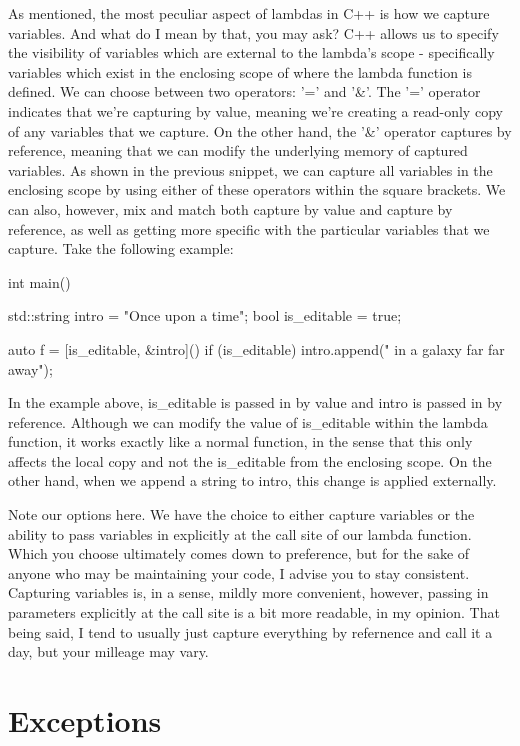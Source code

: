 \documentclass{article}
\begin{document}
As mentioned, the most peculiar aspect of lambdas in C++ is how we capture variables. And what do I mean by
that, you may ask? C++ allows us to specify the visibility of variables which are external to the lambda's
scope - specifically variables which exist in the enclosing scope of where the lambda function is defined.
We can choose between two operators: '=' and '\&'. The '=' operator indicates that we're capturing by value,
meaning we're creating a read-only copy of any variables that we capture. On the other hand, the '\&' operator
captures by reference, meaning that we can modify the underlying memory of captured variables. As shown in
the previous snippet, we can capture all variables in the enclosing scope by using either of these operators
within the square brackets. We can also, however, mix and match both capture by value and capture by reference,
as well as getting more specific with the particular variables that we capture. Take the following example:

\begin{cpplst}
    int main()
    {
        std::string intro = "Once upon a time";
        bool is_editable = true;

        auto f = [is_editable, &intro]() {
            if (is_editable)
            {
                intro.append(" in a galaxy far far away");
            }
        }
    }
\end{cpplst}

In the example above, is\_editable is passed in by value and intro is passed in by reference. Although we can
modify the value of is\_editable within the lambda function, it works exactly like a normal function, in the
sense that this only affects the local copy and not the is\_editable from the enclosing scope. On the other
hand, when we append a string to intro, this change is applied externally.

Note our options here. We have the choice to either capture variables or the ability to pass variables in
explicitly at the call site of our lambda function. Which you choose ultimately comes down to preference,
but for the sake of anyone who may be maintaining your code, I advise you to stay consistent. Capturing
variables is, in a sense, mildly more convenient, however, passing in parameters explicitly at the call site
is a bit more readable, in my opinion. That being said, I tend to usually just capture everything by refernence
and call it a day, but your milleage may vary.

\section{Exceptions}
\end{document}
